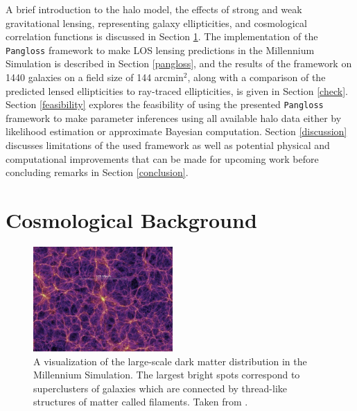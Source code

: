 \documentclass[%
 reprint,
 amsmath,amssymb,
 aps,nofootinbib
]{revtex4-1}
\begin{document}
A brief introduction to the halo model, the effects of strong and weak gravitational lensing, representing galaxy ellipticities, and cosmological correlation functions is discussed in Section \ref{background}. The implementation of the \texttt{Pangloss} framework to make LOS lensing predictions in the Millennium Simulation is described in Section \ref{pangloss}, and the results of the framework on 1440 galaxies on a field size of 144 arcmin$^2$, along with a comparison of the predicted lensed ellipticities to ray-traced ellipticities, is given in Section \ref{check}. Section \ref{feasibility} explores the feasibility of using the presented \texttt{Pangloss} framework to make parameter inferences using all available halo data either by likelihood estimation or approximate Bayesian computation. Section \ref{discussion} discusses limitations of the used framework as well as potential physical and computational improvements that can be made for upcoming work before concluding remarks in Section \ref{conclusion}.

\section{Cosmological Background} \label{background}

\begin{figure}
    \centering
    \includegraphics[width=0.475\textwidth]{figs-swe/thesis/ms_structure.jpg}
    \captionsetup{justification=raggedright,singlelinecheck=false}
    \caption{A visualization of the large-scale dark matter distribution in the Millennium Simulation. The largest bright spots correspond to superclusters of galaxies which are connected by thread-like structures of matter called filaments. Taken from \cite{ms_figures}.}
    \label{fig:ms_structure}
\end{figure}
\end{document}
